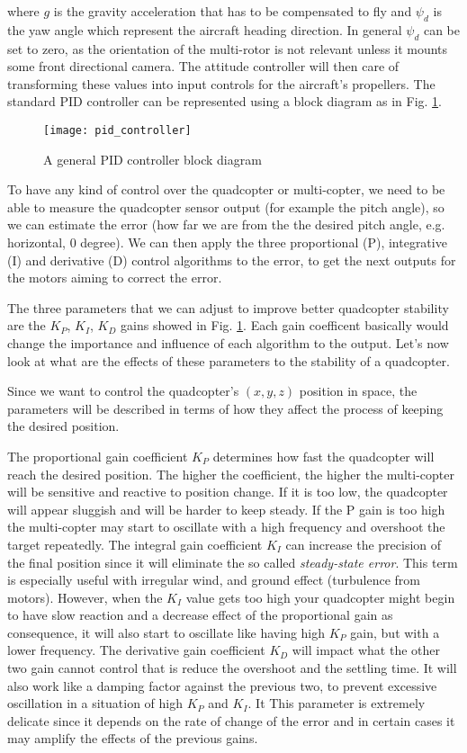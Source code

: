 where $g$ is the gravity acceleration that has to be compensated to fly and $\psi_d$ is the yaw angle which represent the aircraft heading direction. In general $\psi_d$ can be set to zero, as the orientation of the multi-rotor is not relevant unless it mounts some front directional camera. The attitude controller will then care of transforming these values into input controls for the aircraft's propellers. The standard PID controller can be represented using a block diagram as in Fig. \ref{fig:pid_blockDiag}.

\begin{figure}[h]
\texttt{[image: pid\_controller]}
\caption{A general PID controller block diagram}
\label{fig:pid_blockDiag}
\end{figure}


To have any kind of control over the quadcopter or multi-copter, we need to be able to measure the quadcopter sensor output (for example the pitch angle), so we can estimate the error (how far we are from the the desired pitch angle, e.g. horizontal, 0 degree). We can then apply the three proportional (P), integrative (I) and derivative (D) control algorithms to the error, to get the next outputs for the motors aiming to correct the error.

The three parameters that we can adjust to improve better quadcopter stability are the $K_P$, $K_I$, $K_D$ gains showed in Fig. \ref{fig:pid_blockDiag}. Each gain coefficent basically would change the importance and influence of each algorithm to the output. Let's now look at what are the effects of these parameters to the stability of a quadcopter.


Since we want to control the quadcopter's $(x,y,z)$ position in space, the parameters will be described in terms of how they affect the process of keeping the desired position.

The proportional gain coefficient $K_P$ determines how fast the quadcopter will reach the desired position. The higher the coefficient, the higher the multi-copter will be sensitive and reactive to position change. If it is too low, the quadcopter will appear sluggish and will be harder to keep steady. If the P gain is too high the multi-copter may start to oscillate with a high frequency and overshoot the target repeatedly. %
The integral gain coefficient $K_I$ can increase the precision of the final position since it will eliminate the so called \emph{steady-state error}. This term is especially useful with irregular wind, and ground effect (turbulence from motors). However, when the $K_I$ value gets too high your quadcopter might begin to have slow reaction and a decrease effect of the proportional gain as consequence, it will also start to oscillate like having high $K_P$ gain, but with a lower frequency. %
The derivative gain coefficient $K_D$ will impact what the other two gain cannot control that is reduce the overshoot and the settling time. It will also work like a damping factor against the previous two, to prevent excessive oscillation in a situation of high $K_P$ and $K_I$. It  This parameter is extremely delicate since it depends on the rate of change of the error and in certain cases it may amplify the effects of the previous gains.  %

